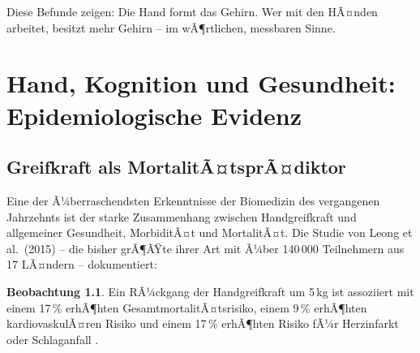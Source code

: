 ﻿\documentclass[12pt,a4paper]{report}
\theoremstyle{plain}
\theoremstyle{definition}
\newtheorem{beobachtung}[theorem]{Beobachtung}
\theoremstyle{remark}
\begin{document}
Diese Befunde zeigen: Die Hand formt das Gehirn. Wer mit den HÃ¤nden
arbeitet, besitzt mehr Gehirn -- im wÃ¶rtlichen, messbaren Sinne.

\chapter{Hand, Kognition und Gesundheit: Epidemiologische Evidenz}
\label{chap:kognition}

\section{Greifkraft als MortalitÃ¤tsprÃ¤diktor}

Eine der Ã¼berraschendsten Erkenntnisse der Biomedizin des vergangenen
Jahrzehnts ist der starke Zusammenhang zwischen Handgreifkraft und
allgemeiner Gesundheit, MorbiditÃ¤t und MortalitÃ¤t. Die Studie von
Leong et al.\ (2015) -- die bisher grÃ¶ÃŸte ihrer Art mit Ã¼ber 140\,000
Teilnehmern aus 17 LÃ¤ndern -- dokumentiert:

\begin{beobachtung}
Ein RÃ¼ckgang der Handgreifkraft um 5\,kg ist assoziiert mit
einem 17\,\% erhÃ¶hten GesamtmortalitÃ¤tsrisiko, einem 9\,\% erhÃ¶hten
kardiovaskulÃ¤ren Risiko und einem 17\,\% erhÃ¶hten Risiko fÃ¼r
Herzinfarkt oder Schlaganfall \cite{leong2015}.
\end{beobachtung}
\end{document}
